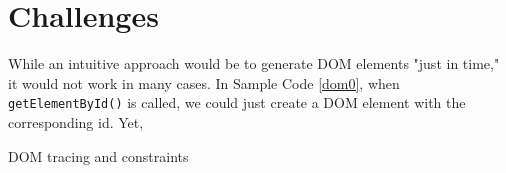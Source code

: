 \section{Challenges}
While an intuitive approach would be to generate DOM elements "just in time," it would not work in many cases.
In Sample Code \ref{dom0}, when {\tt getElementById()} is called, we could just create a DOM element with the corresponding id.
Yet, 
\begin {compactitem}
\item DOM tracing and constraints
\end {compactitem}










\header{}




